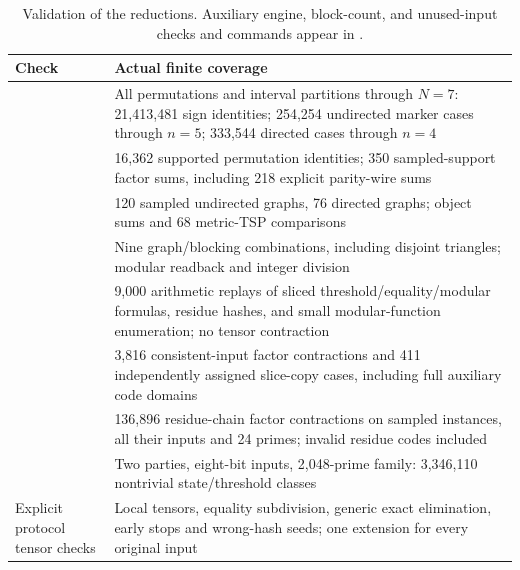 \begin{table}[ht]
\centering\small
\renewcommand{\arraystretch}{1.12}
\begin{tabular}{@{}P{.37\linewidth}P{.55\linewidth}@{}}
\toprule
Check & Actual finite coverage\\
\midrule
{} & All permutations and interval partitions through $N=7$: 21,413,481 sign identities; 254,254 undirected marker cases through $n=5$; 333,544 directed cases through $n=4$\\
 & 16,362 supported permutation identities; 350 sampled-support factor sums, including 218 explicit parity-wire sums\\
 & 120 sampled undirected graphs, 76 directed graphs; object sums and 68 metric-TSP comparisons\\
 & Nine graph/blocking combinations, including disjoint triangles; modular readback and integer division\\
 & 9,000 arithmetic replays of sliced threshold/equality/modular formulas, residue hashes, and small modular-function enumeration; no tensor contraction\\
 & 3,816 consistent-input factor contractions and 411 independently assigned slice-copy cases, including full auxiliary code domains\\
 & 136,896 residue-chain factor contractions on sampled instances, all their inputs and 24 primes; invalid residue codes included\\
 & Two parties, eight-bit inputs, 2,048-prime family: 3,346,110 nontrivial state/threshold classes\\
Explicit protocol tensor checks & Local tensors, equality subdivision, generic exact elimination, early stops and wrong-hash seeds; one extension for every original input\\
\bottomrule
\end{tabular}
\caption{Validation of the reductions. Auxiliary engine, block-count,
and unused-input checks and commands appear in .}
\label{tab:checks}
\end{table}

